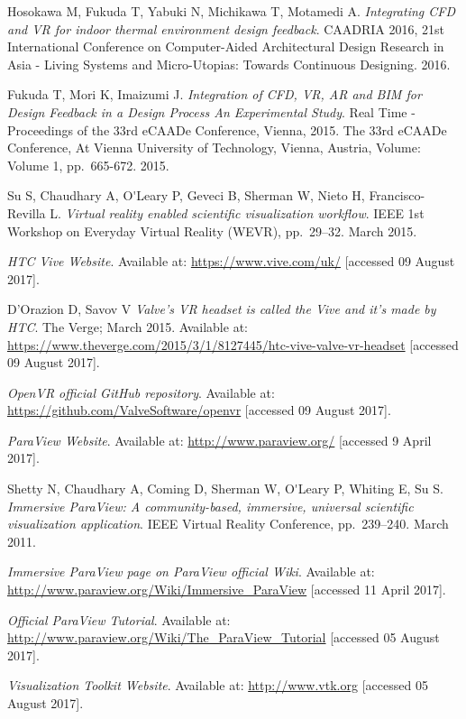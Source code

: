 \begin{thebibliography}{99}
Hosokawa M, Fukuda T, Yabuki N, Michikawa T, Motamedi A.
\textit{Integrating CFD and VR for indoor thermal environment design feedback}.
CAADRIA 2016, 21st International Conference on Computer-Aided Architectural Design Research in Asia - Living Systems and Micro-Utopias: Towards Continuous Designing.
2016.

Fukuda T, Mori K, Imaizumi J.
\textit{Integration of CFD, VR, AR and BIM for Design Feedback in a Design Process An Experimental Study}.
Real Time - Proceedings of the 33rd eCAADe Conference, Vienna, 2015. The 33rd eCAADe Conference, At Vienna University of Technology, Vienna, Austria, Volume: Volume 1,
pp.~665-672.
2015.

	
  Su S, Chaudhary A, O\'{}Leary P, Geveci B, Sherman W, Nieto H, Francisco-Revilla L.
  \textit{Virtual reality enabled scientific visualization workflow}.
  IEEE 1st Workshop on Everyday Virtual Reality (WEVR),
  pp.~29–32. 
  March 2015.
  
\textit{HTC Vive Website}.
Available at: \url{https://www.vive.com/uk/}
[accessed 09 August 2017].

D'Orazion D, Savov V
\textit{Valve's VR headset is called the Vive and it's made by HTC}.
The Verge;
March 2015.
Available at: \url{https://www.theverge.com/2015/3/1/8127445/htc-vive-valve-vr-headset}
[accessed 09 August 2017].

\textit{OpenVR official GitHub repository}.
Available at: \url{https://github.com/ValveSoftware/openvr}
[accessed 09 August 2017].

\emph{ParaView Website}.
Available at: \url{http://www.paraview.org/} [accessed 9 April 2017].

Shetty N, Chaudhary A, Coming D, Sherman W, O\'{}Leary P, Whiting E, Su S.
\textit{Immersive ParaView: A community-based, immersive, universal scientific visualization application}.
IEEE Virtual Reality Conference,
pp.~239–240.
March 2011.

\textit{Immersive ParaView page on ParaView official Wiki}.
Available at: \url{http://www.paraview.org/Wiki/Immersive_ParaView} [accessed 11 April 2017].


\textit{Official ParaView Tutorial}.
Available at: \url{http://www.paraview.org/Wiki/The_ParaView_Tutorial}
[accessed 05 August 2017].

\textit{Visualization Toolkit Website}.
Available at: \url{http://www.vtk.org}
[accessed 05 August 2017].


\end{thebibliography}
